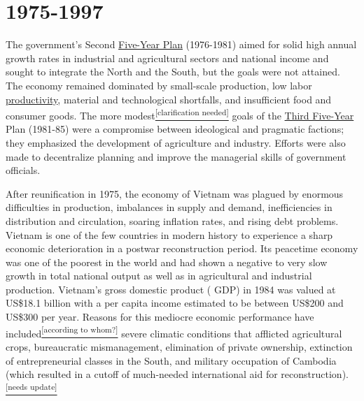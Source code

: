 \documentclass[openany]{book}
\begin{document}
\section{1975-1997}
The government's Second \href{https://en.wikipedia.org/wiki/Five-Year_Plans_of_Vietnam#The_Second_Five-Year_Plan_(1976%E2%80%9380)}{Five-Year Plan} (1976-1981) aimed for solid high annual growth rates in industrial and agricultural sectors and national income and sought to integrate the North and the South, but the goals were not attained. The economy remained dominated by small-scale production, low labor \href{https://en.wikipedia.org/wiki/Productivity}{productivity}, material and technological shortfalls, and insufficient food and consumer goods.\cite{36} The more modest\href{https://en.wikipedia.org/wiki/Wikipedia:Please_clarify}{\textsuperscript{[clarification needed]}} goals of the \href{https://en.wikipedia.org/wiki/Five-year_plans_of_Vietnam#The_Third_Five_Year_Plan_(1981%E2%80%9385)}{Third Five-Year} Plan (1981-85) were a compromise between ideological and pragmatic factions; they emphasized the development of agriculture and industry. Efforts were also made to decentralize planning and improve the managerial skills of government officials.\cite{36}

After reunification in 1975, the economy of Vietnam was plagued by enormous difficulties in production, imbalances in supply and demand, inefficiencies in distribution and circulation, soaring inflation rates, and rising debt problems. Vietnam is one of the few countries in modern history to experience a sharp economic deterioration in a postwar reconstruction period.\cite{38} Its peacetime economy was one of the poorest in the world and had shown a negative to very slow growth in total national output as well as in agricultural and industrial production.\cite{39} Vietnam's gross domestic product ( GDP) in 1984 was valued at US\$18.1 billion with a per capita income estimated to be between US\$200 and US\$300 per year. Reasons for this mediocre economic performance have included\href{https://en.wikipedia.org/wiki/Wikipedia:Manual_of_Style/Words_to_watch#Unsupported_attributions}{\textsuperscript{[according to whom?]}} severe climatic conditions that afflicted agricultural crops, bureaucratic mismanagement, elimination of private ownership, extinction of entrepreneurial classes in the South, and military occupation of Cambodia (which resulted in a cutoff of much-needed international aid for reconstruction).\cite{40}\href{https://en.wikipedia.org/wiki/Wikipedia:Manual_of_Style/Dates_and_numbers#Chronological_items}{\textsuperscript{[needs update]}}
\end{document}
